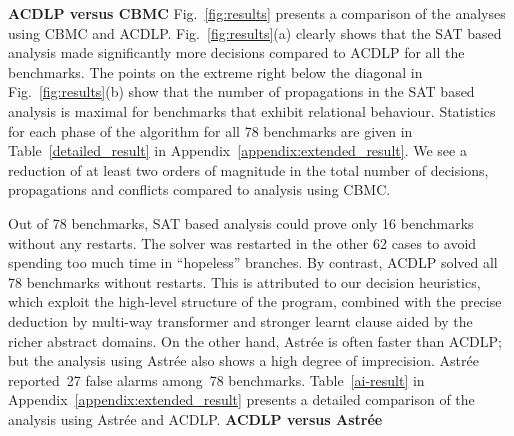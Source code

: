 


%
\textbf{ACDLP versus CBMC}
Fig.~\ref{fig:results} presents a comparison of the analyses using CBMC
and ACDLP.  Fig.~\ref{fig:results}(a) clearly shows that the SAT based analysis 
made significantly more decisions compared to ACDLP for all the benchmarks. 
The points on the extreme right below the diagonal in
Fig.~\ref{fig:results}(b) show that the number of propagations in the SAT based 
analysis is maximal for benchmarks that exhibit relational behaviour. 
Statistics for each phase of the algorithm for all 78 benchmarks are 
given in Table~\ref{detailed_result} in Appendix~\ref{appendix:extended_result}.  
We see a reduction of at least two orders of magnitude in the total number 
of decisions, propagations and conflicts compared to analysis using CBMC.  

Out of 78 benchmarks, SAT based analysis could prove only 16
benchmarks without any restarts.  The solver was restarted in the other 62 cases to
avoid spending too much time in ``hopeless'' branches.  By contrast, 
ACDLP solved all 78 benchmarks without restarts.  This is
attributed to our decision heuristics, which exploit the high-level
structure of the program, combined with the precise deduction by multi-way 
transformer and stronger learnt clause aided by the richer abstract domains.  
On the other hand, Astr{\'e}e is often faster than ACDLP; but the analysis using
Astr{\'e}e also shows a high degree of imprecision.  Astr{\'e}e reported~27 false
alarms among~78 benchmarks. Table~\ref{ai-result} in 
Appendix~\ref{appendix:extended_result} presents a detailed comparison of the analysis
using Astr{\'e}e and ACDLP.
%
\textbf{ACDLP versus Astr{\'e}e} 
